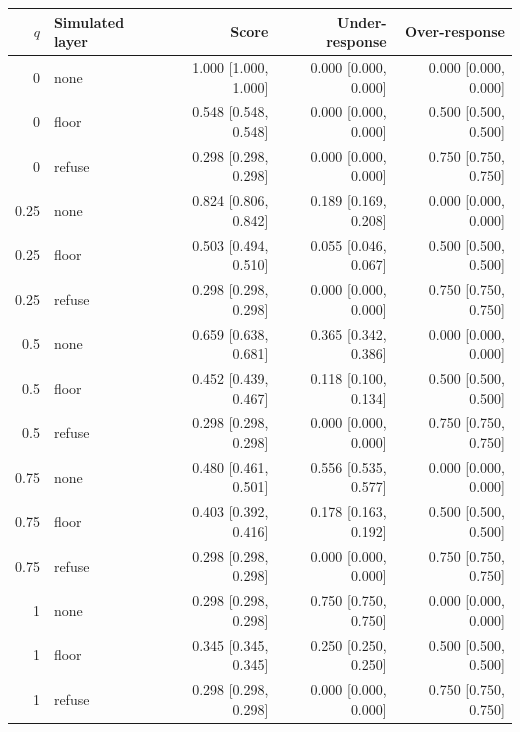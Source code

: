 \begin{tabular}{rlrrr}
\toprule
$q$ & Simulated layer & Score & Under-response & Over-response \\
\midrule
0 & none & 1.000 [1.000, 1.000] & 0.000 [0.000, 0.000] & 0.000 [0.000, 0.000] \\
0 & floor & 0.548 [0.548, 0.548] & 0.000 [0.000, 0.000] & 0.500 [0.500, 0.500] \\
0 & refuse & 0.298 [0.298, 0.298] & 0.000 [0.000, 0.000] & 0.750 [0.750, 0.750] \\
0.25 & none & 0.824 [0.806, 0.842] & 0.189 [0.169, 0.208] & 0.000 [0.000, 0.000] \\
0.25 & floor & 0.503 [0.494, 0.510] & 0.055 [0.046, 0.067] & 0.500 [0.500, 0.500] \\
0.25 & refuse & 0.298 [0.298, 0.298] & 0.000 [0.000, 0.000] & 0.750 [0.750, 0.750] \\
0.5 & none & 0.659 [0.638, 0.681] & 0.365 [0.342, 0.386] & 0.000 [0.000, 0.000] \\
0.5 & floor & 0.452 [0.439, 0.467] & 0.118 [0.100, 0.134] & 0.500 [0.500, 0.500] \\
0.5 & refuse & 0.298 [0.298, 0.298] & 0.000 [0.000, 0.000] & 0.750 [0.750, 0.750] \\
0.75 & none & 0.480 [0.461, 0.501] & 0.556 [0.535, 0.577] & 0.000 [0.000, 0.000] \\
0.75 & floor & 0.403 [0.392, 0.416] & 0.178 [0.163, 0.192] & 0.500 [0.500, 0.500] \\
0.75 & refuse & 0.298 [0.298, 0.298] & 0.000 [0.000, 0.000] & 0.750 [0.750, 0.750] \\
1 & none & 0.298 [0.298, 0.298] & 0.750 [0.750, 0.750] & 0.000 [0.000, 0.000] \\
1 & floor & 0.345 [0.345, 0.345] & 0.250 [0.250, 0.250] & 0.500 [0.500, 0.500] \\
1 & refuse & 0.298 [0.298, 0.298] & 0.000 [0.000, 0.000] & 0.750 [0.750, 0.750] \\
\bottomrule
\end{tabular}
